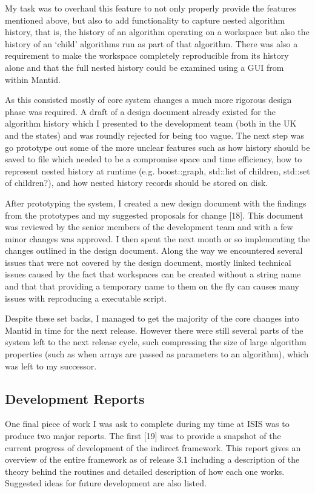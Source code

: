 \documentclass[paper=a4, fontsize=11pt]{scrartcl}	%
\numberwithin{equation}{section}															%
\numberwithin{figure}{section}																%
\numberwithin{table}{section}
\begin{document}
My task was to overhaul this feature to not only properly provide the
features mentioned above, but also to add functionality to capture
nested algorithm history, that is, the history of an algorithm operating
on a workspace but also the history of an `child' algorithms run as part
of that algorithm. There was also a requirement to make the workspace
completely reproducible from its history alone and that the full nested
history could be examined using a GUI from within Mantid.

As this consisted mostly of core system changes a much more rigorous
design phase was required. A draft of a design document already existed
for the algorithm history which I presented to the development team
(both in the UK and the states) and was roundly rejected for being too
vague. The next step was go prototype out some of the more unclear
features such as how history should be saved to file which needed to be
a compromise space and time efficiency, how to represent nested history
at runtime (e.g. boost::graph, std::list of children, std::set of children?),
and how nested history records should be stored on disk.

After prototyping the system, I created a new design document with the
findings from the prototypes and my suggested proposals for change
{[}18{]}. This document was reviewed by the senior members of the
development team and with a few minor changes was approved. I then spent
the next month or so implementing the changes outlined in the design
document. Along the way we encountered several issues that were not
covered by the design document, mostly linked technical issues caused by
the fact that workspaces can be created without a string name and that
that providing a temporary name to them on the fly can causes many
issues with reproducing a executable script.

Despite these set backs, I managed to get the majority of the core
changes into Mantid in time for the next release. However there were
still several parts of the system left to the next release cycle, such
compressing the size of large algorithm properties (such as when arrays
are passed as parameters to an algorithm), which was left to my
successor.

\subsection{Development Reports}\label{development-reports}

One final piece of work I was ask to complete during my time at ISIS was
to produce two major reports. The first {[}19{]} was to provide a snapshot of the
current progress of development of the indirect framework. This report
gives an overview of the entire framework as of release 3.1 including a
description of the theory behind the routines and detailed description
of how each one works. Suggested ideas for future development are also
listed. 
\end{document}

